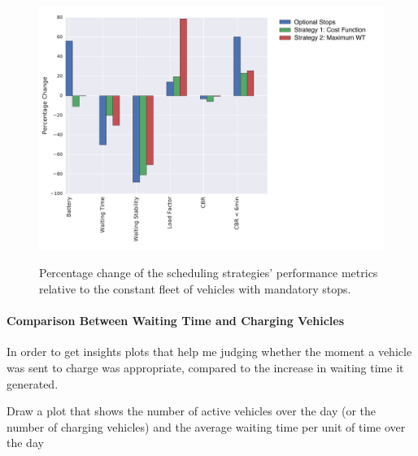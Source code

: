 \documentclass[12pt,a4paper]{article}
\begin{document}
\begin{figure}[h] 
  \centering
  \caption{Percentage change of the scheduling strategies' performance metrics relative to the constant fleet of vehicles with mandatory stops.}
\includegraphics[scale=0.6]{./images/strategyCompare.pdf}
\label{compare}
\end{figure}

\paragraph{Comparison Between Waiting Time and Charging Vehicles}
In order to get insights 
plots that help me judging whether the moment a vehicle was sent to charge was appropriate, compared to the increase in waiting time it generated.

Draw a plot that  shows the number of active vehicles over the day (or the number of charging vehicles)
and the average waiting time per unit of time over the day
\end{document}

